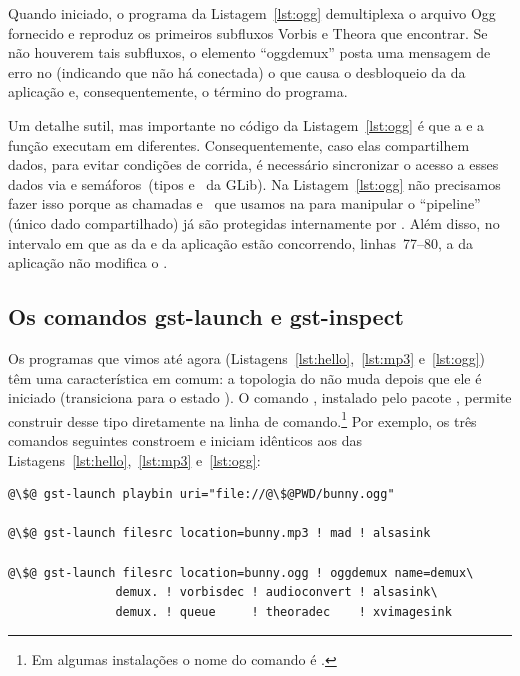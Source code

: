 \documentclass{SBCbookchapter}
\begin{document}
Quando iniciado, o programa da Listagem~\ref{lst:ogg} demultiplexa o arquivo
Ogg fornecido e reproduz os primeiros subfluxos Vorbis e Theora que
encontrar.  Se não houverem tais subfluxos, o elemento ``oggdemux'' posta
uma mensagem de erro no  (indicando que não há 
conectada) o que causa o desbloqueio da  da aplicação e,
consequentemente, o término do programa.

Um detalhe sutil, mas importante no código da Listagem~\ref{lst:ogg} é que a
  e a função  executam em 
diferentes.  Consequentemente, caso elas compartilhem dados, para evitar
condições de corrida, é necessário sincronizar o acesso a esses dados via
 e semáforos~(tipos  e~ da GLib).  Na
Listagem~\ref{lst:ogg} não precisamos fazer isso porque as chamadas
 e~ que usamos na  para
manipular o ``pipeline'' (único dado compartilhado) já são protegidas
internamente por .  Além disso, no intervalo em que as
 da  e da aplicação estão concorrendo,
linhas~77--80, a  da aplicação não modifica o .


\subsection*{Os comandos gst-launch e gst-inspect}

Os programas que vimos até agora (Listagens~\ref{lst:hello},~\ref{lst:mp3}
e~\ref{lst:ogg}) têm uma característica em comum: a topologia do
 não muda depois que ele é iniciado (transiciona para o estado
).  O comando , instalado pelo pacote
, permite construir  desse tipo diretamente na
linha de comando.\footnote{Em algumas instalações o nome do comando é
  .}  Por exemplo, os três comandos seguintes constroem e
iniciam  idênticos aos das
Listagens~\ref{lst:hello},~\ref{lst:mp3} e~\ref{lst:ogg}:
\begin{lstlisting}[style=command]
@\$@ gst-launch playbin uri="file://@\$@PWD/bunny.ogg"

@\$@ gst-launch filesrc location=bunny.mp3 ! mad ! alsasink

@\$@ gst-launch filesrc location=bunny.ogg ! oggdemux name=demux\
               demux. ! vorbisdec ! audioconvert ! alsasink\
               demux. ! queue     ! theoradec    ! xvimagesink
\end{lstlisting}
\end{document}
